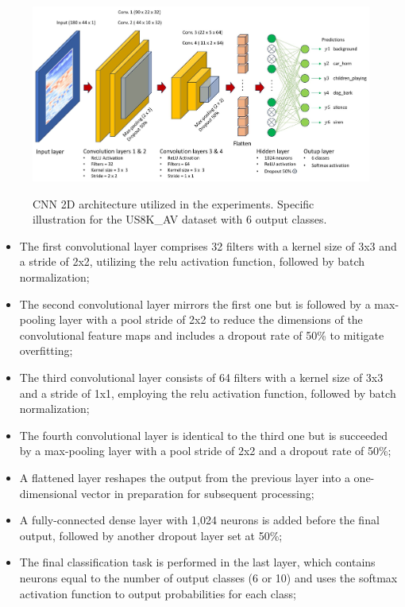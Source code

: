 \begin{figure}[htbp]
    \raggedright
        \caption{CNN 2D architecture utilized in the experiments. Specific illustration for the US8K\_AV dataset with 6 output classes.}
        \includegraphics[width=1\textwidth]{resources/images/050-methods/Methods_training_CNN2D_architecture.jpg}
        \label{fig:methods_training_CNN_2D_architecture}
\end{figure} 

\begin{itemize}
    \item The first convolutional layer comprises 32 filters with a kernel size of 3x3 and a stride of 2x2, utilizing the \gls{relu} activation function, followed by batch normalization;
    \item The second convolutional layer mirrors the first one but is followed by a max-pooling layer with a pool stride of 2x2 to reduce the dimensions of the convolutional feature maps and includes a dropout rate of 50\% to mitigate overfitting;
    \item The third convolutional layer consists of 64 filters with a kernel size of 3x3 and a stride of 1x1, employing the \gls{relu} activation function, followed by batch normalization;
    \item The fourth convolutional layer is identical to the third one but is succeeded by a max-pooling layer with a pool stride of 2x2 and a dropout rate of 50\%;
    \item A flattened layer reshapes the output from the previous layer into a one-dimensional vector in preparation for subsequent processing;
    \item A fully-connected dense layer with 1,024 neurons is added before the final output, followed by another dropout layer set at 50\%;
    \item The final classification task is performed in the last layer, which contains neurons equal to the number of output classes (6 or 10) and uses the softmax activation function to output probabilities for each class;
\end{itemize}

